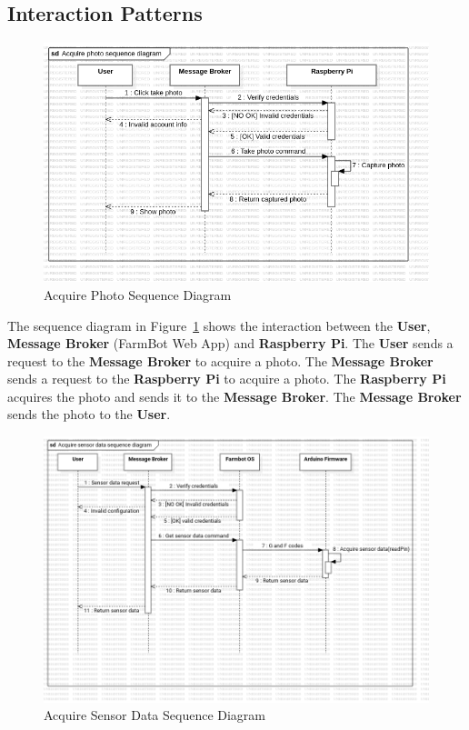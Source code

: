 
\subsection{Interaction Patterns}
\begin{figure}[H]
    \centering
    \includegraphics[width=1\textwidth]{Figures/SequenceDiagarm_photo.png}
    \caption{Acquire Photo Sequence Diagram}\label{fig:SequenceDiagram1}
\end{figure}


The sequence diagram in Figure~\ref{fig:SequenceDiagram1} shows the interaction between the \textbf{User}, \textbf{Message Broker} (FarmBot Web App) and \textbf{Raspberry Pi}. The \textbf{User} sends a request to the \textbf{Message Broker} to acquire a photo. The \textbf{Message Broker} sends a request to the \textbf{Raspberry Pi} to acquire a photo. The \textbf{Raspberry Pi} acquires the photo and sends it to the \textbf{Message Broker}. The \textbf{Message Broker} sends the photo to the \textbf{User}.

\begin{figure}[H]
    \centering
    \includegraphics[width=1\textwidth]{Figures/SequenceDiagarm_sensorData.png}
    \caption{Acquire Sensor Data Sequence Diagram}\label{fig:SequenceDiagram2}
\end{figure}

